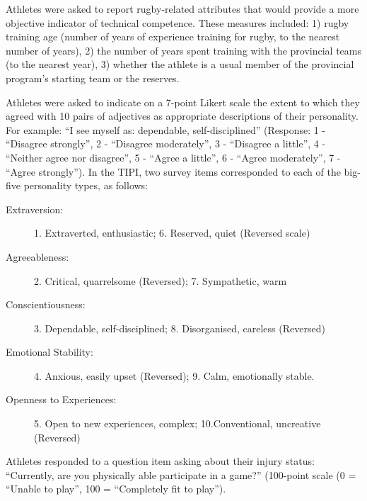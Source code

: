 \begin{CJK}{UTF8}{gbsn}


Athletes were asked to report rugby-related attributes that would provide a more objective indicator of technical competence. These measures included: 1) rugby training age (number of years of experience training for rugby, to the nearest number of years), 2) the number of years spent training with the provincial teams (to the nearest year), 3) whether the athlete is a usual member of the provincial program's starting team or the reserves.


Athletes were asked to indicate on a 7-point Likert scale the extent to which they agreed with 10 pairs of adjectives as appropriate descriptions of their personality. For example: ``I see myself as: dependable, self-disciplined'' (Response: 1 - ``Disagree strongly'', 2 - ``Disagree moderately'',  3 - ``Disagree a little'', 4 - ``Neither agree nor disagree'', 5 - ``Agree a little'', 6 - ``Agree moderately'', 7 - ``Agree strongly''). In the TIPI, two survey items corresponded to each of the big-five personality types, as follows:

\begin{description}
\item [Extraversion:] 1. Extraverted, enthusiastic; 6. Reserved, quiet (Reversed scale)
\item [Agreeableness:] 2. Critical, quarrelsome (Reversed); 7. Sympathetic, warm
\item [Conscientiousness:] 3. Dependable, self-disciplined; 8. Disorganised, careless (Reversed)
\item [Emotional Stability:] 4. Anxious, easily upset (Reversed); 9. Calm, emotionally stable.
\item [Openness to Experiences:] 5. Open to new experiences, complex; 10.Conventional, uncreative (Reversed)
\end{description}


Athletes responded to a question item asking about their injury status: ``Currently, are you physically able participate in a game?'' (100-point scale (0 = ``Unable to play'', 100 = ``Completely fit to play'').


\end{CJK}
